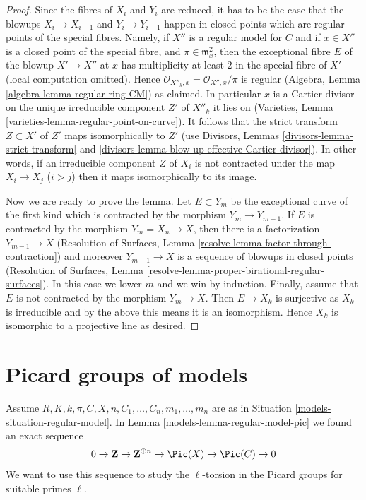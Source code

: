 \begin{proof}
\medskip\noindent
Since the fibres of $X_i$ and $Y_i$ are reduced, it has to be the
case that the blowups $X_i \to X_{i - 1}$ and $Y_i \to Y_{i - 1}$
happen in closed points which are regular points of the special fibres.
Namely, if $X''$ is a regular model for $C$ and if $x \in X''$
is a closed point of the special fibre, and
$\pi \in \mathfrak m_x^2$, then the exceptional fibre $E$ of the
blowup $X' \to X''$ at $x$ has multiplicity at least $2$ in the
special fibre of $X'$ (local computation omitted).
Hence $\mathcal{O}_{X''_k, x} = \mathcal{O}_{X'', x}/\pi$ is
regular (Algebra, Lemma \ref{algebra-lemma-regular-ring-CM}) as claimed.
In particular $x$ is a Cartier divisor on the unique
irreducible component $Z'$ of $X''_k$ it lies on
(Varieties, Lemma \ref{varieties-lemma-regular-point-on-curve}).
It follows that the strict transform $Z \subset X'$ of $Z'$
maps isomorphically to $Z'$
(use Divisors, Lemmas \ref{divisors-lemma-strict-transform} and
\ref{divisors-lemma-blow-up-effective-Cartier-divisor}).
In other words, if an irreducible component $Z$ of $X_i$
is not contracted under the map $X_i \to X_j$ ($i > j$)
then it maps isomorphically to its image.

\medskip\noindent
Now we are ready to prove the lemma.
Let $E \subset Y_m$ be the exceptional curve of the first kind
which is contracted by the morphism $Y_m \to Y_{m - 1}$. If $E$ is
contracted by the morphism $Y_m = X_n \to X$, then there is a factorization
$Y_{m - 1} \to X$ (Resolution of Surfaces, Lemma
\ref{resolve-lemma-factor-through-contraction})
and moreover $Y_{m - 1} \to X$ is a sequence of blowups
in closed points (Resolution of Surfaces, Lemma
\ref{resolve-lemma-proper-birational-regular-surfaces}).
In this case we lower $m$ and we win by induction.
Finally, assume that $E$ is not contracted by the morphism $Y_m \to X$.
Then $E \to X_k$ is surjective as $X_k$ is irreducible
and by the above this means it is an isomorphism.
Hence $X_k$ is isomorphic to a projective line as desired.
\end{proof}

\section{Picard groups of models}
\label{models-section-picard-groups-models}
Assume $R, K, k, \pi, C, X, n, C_1, \ldots, C_n, m_1, \ldots, m_n$
are as in Situation \ref{models-situation-regular-model}.
In Lemma \ref{models-lemma-regular-model-pic} we found an exact sequence
$$
0 \to \mathbf{Z} \to \mathbf{Z}^{\oplus n} \to
\Pic(X) \to \Pic(C) \to 0
$$
We want to use this sequence to study the $\ell$-torsion in the
Picard groups for suitable primes $\ell$.

